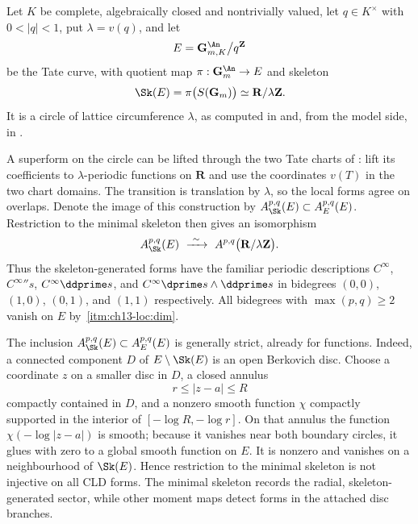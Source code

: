 \begin{example}
\label{ex:ch13-tate-forms}
Let $K$ be complete, algebraically closed and nontrivially valued, let
$q\in K^\times$ with $0<|q|<1$, put $\lambda=v(q)$, and let
\[
 E=\mathbf G_{m,K}^{\An}\big/q^{\mathbf Z}
\]
be the Tate curve, with quotient map $\pi:\mathbf G_m^{\An}\to E$ and
skeleton
\[
 \Sk(E)=\pi\bigl(S(\mathbf G_m)\bigr)\simeq\mathbf R/\lambda\mathbf Z.
\]
It is a circle of lattice circumference $\lambda$, as computed in
 and, from the model side, in
.

A superform on the circle can be lifted through the two Tate charts of
: lift its coefficients to $\lambda$-periodic
functions on $\mathbf R$ and use the coordinates $v(T)$ in the two chart
domains.  The transition is translation by $\lambda$, so the local forms
agree on overlaps.  Denote the image of this construction by
$A^{p,q}_{\Sk}(E)\subset A^{p,q}_E(E)$.  Restriction to the minimal skeleton
then gives an isomorphism
\[
 A^{p,q}_{\Sk}(E)\ \xrightarrow{\ \sim\ }\
 A^{p,q}\bigl(\mathbf R/\lambda\mathbf Z\bigr).
\]
Thus the skeleton-generated forms have the familiar periodic descriptions
$C^\infty$, $C^\infty\dprime s$, $C^\infty\ddprime s$, and
$C^\infty\dprime s\wedge\ddprime s$ in bidegrees $(0,0)$, $(1,0)$,
$(0,1)$, and $(1,1)$ respectively.  All bidegrees with
$\max(p,q)\ge2$ vanish on $E$ by
\,\cref{itm:ch13-loc:dim}.

The inclusion $A^{p,q}_{\Sk}(E)\subset A^{p,q}_E(E)$ is generally strict,
already for functions.  Indeed, a connected component $D$ of
$E\setminus\Sk(E)$ is an open Berkovich disc.  Choose a coordinate $z$ on a
smaller disc in $D$, a closed annulus
\[
                 r\le |z-a|\le R
\]
compactly contained in $D$, and a nonzero smooth function $\chi$ compactly
supported in the interior of $[-\log R,-\log r]$.  On that annulus the
function $\chi(-\log|z-a|)$ is smooth; because it vanishes near both boundary
circles, it glues with zero to a global smooth function on $E$.  It is
nonzero and vanishes on a neighbourhood of $\Sk(E)$.  Hence restriction to
the minimal skeleton is not injective on all CLD forms.  The minimal skeleton
records the radial, skeleton-generated sector, while other moment maps detect
forms in the attached disc branches.
\end{example}

